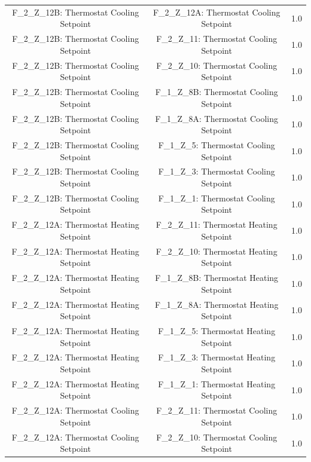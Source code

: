 \documentclass[aps, 10pt, a4paper]{article}
\begin{document}
\begin{longtable}{c|c||c}
                    F\_2\_Z\_12B: Thermostat Cooling Setpoint & F\_2\_Z\_12A: Thermostat Cooling Setpoint & 1.0 \\
                    F\_2\_Z\_12B: Thermostat Cooling Setpoint & F\_2\_Z\_11: Thermostat Cooling Setpoint & 1.0 \\
                    F\_2\_Z\_12B: Thermostat Cooling Setpoint & F\_2\_Z\_10: Thermostat Cooling Setpoint & 1.0 \\
                    F\_2\_Z\_12B: Thermostat Cooling Setpoint & F\_1\_Z\_8B: Thermostat Cooling Setpoint & 1.0 \\
                    F\_2\_Z\_12B: Thermostat Cooling Setpoint & F\_1\_Z\_8A: Thermostat Cooling Setpoint & 1.0 \\
                    F\_2\_Z\_12B: Thermostat Cooling Setpoint & F\_1\_Z\_5: Thermostat Cooling Setpoint & 1.0 \\
                    F\_2\_Z\_12B: Thermostat Cooling Setpoint & F\_1\_Z\_3: Thermostat Cooling Setpoint & 1.0 \\
                    F\_2\_Z\_12B: Thermostat Cooling Setpoint & F\_1\_Z\_1: Thermostat Cooling Setpoint & 1.0 \\
                    F\_2\_Z\_12A: Thermostat Heating Setpoint & F\_2\_Z\_11: Thermostat Heating Setpoint & 1.0 \\
                    F\_2\_Z\_12A: Thermostat Heating Setpoint & F\_2\_Z\_10: Thermostat Heating Setpoint & 1.0 \\
                    F\_2\_Z\_12A: Thermostat Heating Setpoint & F\_1\_Z\_8B: Thermostat Heating Setpoint & 1.0 \\
                    F\_2\_Z\_12A: Thermostat Heating Setpoint & F\_1\_Z\_8A: Thermostat Heating Setpoint & 1.0 \\
                    F\_2\_Z\_12A: Thermostat Heating Setpoint & F\_1\_Z\_5: Thermostat Heating Setpoint & 1.0 \\
                    F\_2\_Z\_12A: Thermostat Heating Setpoint & F\_1\_Z\_3: Thermostat Heating Setpoint & 1.0 \\
                    F\_2\_Z\_12A: Thermostat Heating Setpoint & F\_1\_Z\_1: Thermostat Heating Setpoint & 1.0 \\
                    F\_2\_Z\_12A: Thermostat Cooling Setpoint & F\_2\_Z\_11: Thermostat Cooling Setpoint & 1.0 \\
                    F\_2\_Z\_12A: Thermostat Cooling Setpoint & F\_2\_Z\_10: Thermostat Cooling Setpoint & 1.0 \\

\end{longtable}
\end{document}
